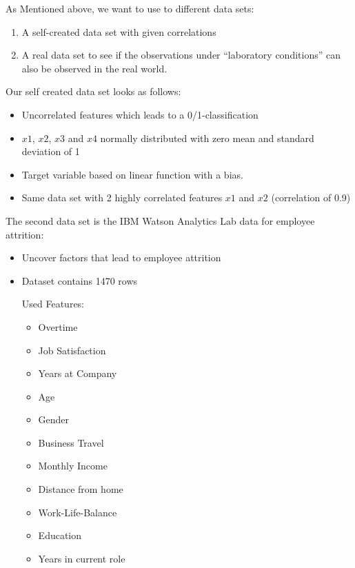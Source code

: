 \documentclass[
]{krantz}
\providecommand{\tightlist}{%
  \setlength{\itemsep}{0pt}\setlength{\parskip}{0pt}}
\begin{document}
As Mentioned above, we want to use to different data sets:

\begin{enumerate}
\def\labelenumi{\arabic{enumi}.}
\item
  A self-created data set with given correlations
\item
  A real data set to see if the observations under ``laboratory conditions'' can also be observed in the real world.
\end{enumerate}

Our self created data set looks as follows:

\begin{itemize}
\tightlist
\item
  Uncorrelated features which leads to a 0/1-classification
\item
  \(x1\), \(x2\), \(x3\) and \(x4\) normally distributed with zero mean and standard deviation of 1
\item
  Target variable based on linear function with a bias.
\item
  Same data set with 2 highly correlated features \(x1\) and \(x2\) (correlation of 0.9)
\end{itemize}

The second data set is the IBM Watson Analytics Lab data for employee attrition:

\begin{itemize}
\item
  Uncover factors that lead to employee attrition
\item
  Dataset contains 1470 rows

  Used Features:

  \begin{itemize}
  \tightlist
  \item
    Overtime
  \item
    Job Satisfaction
  \item
    Years at Company
  \item
    Age
  \item
    Gender
  \item
    Business Travel
  \item
    Monthly Income
  \item
    Distance from home
  \item
    Work-Life-Balance
  \item
    Education
  \item
    Years in current role
  \end{itemize}
\end{itemize}
\end{document}
